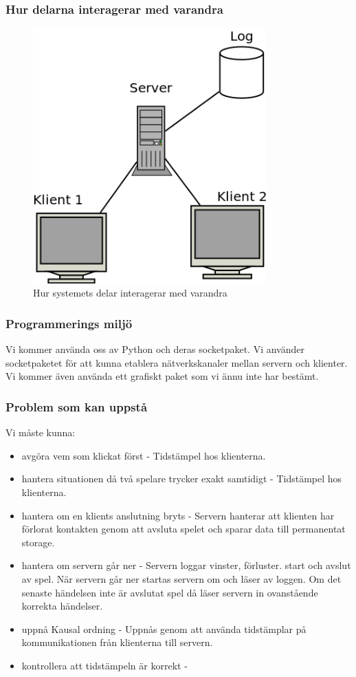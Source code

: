 \documentclass[a4paper]{article}
\begin{document}
\subsubsection{Hur delarna interagerar med varandra}

\begin{figure}[H]
\includegraphics[width=0.8\textwidth]{design.png}
\caption{Hur systemets delar interagerar med varandra}
\end{figure}

\subsubsection{Programmerings miljö}
Vi kommer använda oss av Python och deras socketpaket. Vi använder socketpaketet för att kunna etablera nätverkskanaler mellan servern och klienter. Vi kommer även använda ett grafiskt paket som vi ännu inte har bestämt.
\subsubsection{Problem som kan uppstå}
Vi måste kunna:
\begin{itemize}
\item avgöra vem som klickat först - Tidstämpel hos klienterna.
\item hantera situationen då två spelare trycker exakt samtidigt -  Tidstämpel hos klienterna.
\item hantera om en klients anslutning bryts - Servern hanterar att klienten har förlorat kontakten genom att avsluta spelet och sparar data till permanentat storage.
\item hantera om servern går ner - Servern loggar vinster, förluster. start och avslut av spel. När servern går ner startas servern om och läser av loggen. Om det senaste händelsen inte är avslutat spel då läser servern in ovanstående korrekta händelser.
\item uppnå Kausal ordning - Uppnås genom att använda tidstämplar på kommunikationen från klienterna till servern.
\item kontrollera att tidstämpeln är korrekt -
\end{itemize}
\end{document}
